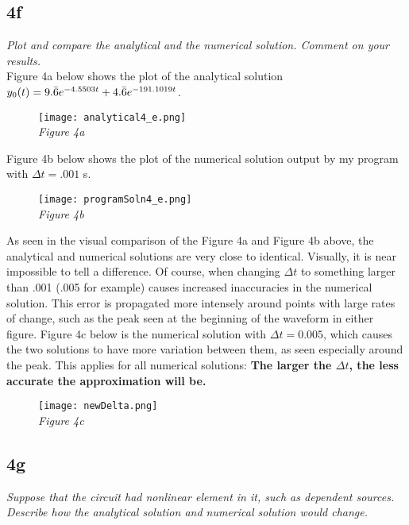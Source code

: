 \documentclass[10pt, AMS Euler]{article}
\begin{document}
\subsection*{4f}
\textit{Plot and compare the analytical and the numerical solution. Comment on your results.}\\

Figure 4a below shows the plot of the analytical solution $y_0(t) = 9.\Bar{6}e^{-4.5503t} + 4.\Bar{6}e^{-191.1019t}$.

\begin{figure}[H]
    \centering
    \texttt{[image: analytical4\_e.png]}\\
    \textit{Figure 4a}
\end{figure}

Figure 4b below shows the plot of the numerical solution output by my program with $\Delta t = .001$ s.

\begin{figure}[H]
    \centering
    \texttt{[image: programSoln4\_e.png]}\\
    \textit{Figure 4b}
\end{figure}

As seen in the visual comparison of the Figure 4a and Figure 4b above, the analytical and numerical solutions are very close to identical. Visually, it is near impossible to tell a difference. Of course, when changing $\Delta t$ to something larger than .001 (.005 for example) causes increased inaccuracies in the numerical solution. This error is propagated more intensely around points with large rates of change, such as the peak seen at the beginning of the waveform in either figure. Figure 4c below is the numerical solution with $\Delta t = 0.005$, which causes the two solutions to have more variation between them, as seen especially around the peak. This applies for all numerical solutions: \textbf{The larger the $\Delta t$, the less accurate the approximation will be.}

\begin{figure}[H]
    \centering
    \texttt{[image: newDelta.png]}\\
    \textit{Figure 4c}
\end{figure}

\subsection*{4g}
\textit{Suppose that the circuit had nonlinear element in it, such as dependent sources. Describe how the analytical solution and numerical solution would change.}\\
\end{document}
